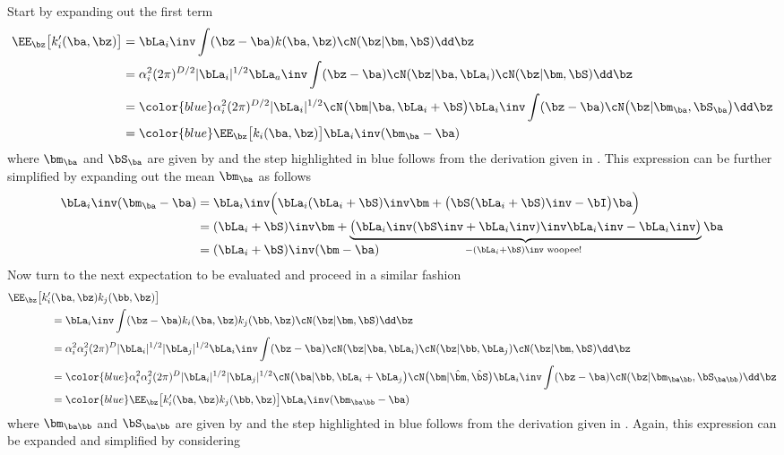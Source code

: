 Start by expanding out the first term
\begin{align}
\nonumber \EE_{\bz}\big[k'_i(\ba,\bz)\big]
&= \bLa_i\inv \int (\bz - \ba) k(\ba,\bz) \cN(\bz|\bm,\bS) \dd\bz \\
\nonumber &= \alpha_i^2(2\pi)^{D/2} |\bLa_i|^{1/2} \bLa_a\inv  \int (\bz - \ba)  \cN(\bz|\ba,\bLa_i) \cN(\bz|\bm,\bS)  \dd\bz   \\
\nonumber &= {\color{blue} \alpha_i^2 (2\pi)^{D/2} |\bLa_i|^{1/2}  \cN\big(\bm|\ba,\bLa_i+\bS\big) }
\bLa_i\inv \int (\bz - \ba) \cN\big(\bz|\bm_{\ba},\bS_{\ba}\big)  \dd\bz   \\
&=  {\color{blue} \EE_{\bz}\big[k_i(\ba,\bz)\big] } \bLa_i\inv (\bm_{\ba} - \ba)
\label{eqn:d1exp}
\end{align}
where $\bm_{\ba}$ and $\bS_{\ba}$ are given by  and the step highlighted in blue follows from the derivation given in . This expression can be further simplified by expanding out the mean $\bm_{\ba}$ as follows
\begin{align*}
\bLa_i\inv(\bm_{\ba} - \ba) 
&= \bLa_i\inv \Big( \bLa_i(\bLa_i+\bS)\inv\bm + \big(\bS(\bLa_i+\bS)\inv - \bI\big)\ba \Big) \\
&= (\bLa_i+\bS)\inv\bm
+ \underbrace{ \big(\bLa_i\inv(\bS\inv+\bLa_i\inv)\inv\bLa_i\inv - \bLa_i\inv\big) }
_{-(\bLa_i+\bS)\inv \text{  woopee! }} \ba  \\[-0.5cm]
&= (\bLa_i+\bS)\inv(\bm - \ba)
\end{align*}
Now turn to the next expectation to be evaluated and proceed in a similar fashion
\begin{align}
\nonumber \EE_{\bz}\big[k'_i&(\ba,\bz)k_j(\bb,\bz)\big] \\
\nonumber &= \bLa_i\inv \int (\bz - \ba) k_i(\ba,\bz)k_j(\bb,\bz) \cN(\bz|\bm, \bS) \dd\bz \\
\nonumber &= \alpha_i^2\alpha_j^2 (2\pi)^{D} |\bLa_i|^{1/2} |\bLa_j|^{1/2}
\bLa_i\inv \int (\bz - \ba) \cN(\bz|\ba,\bLa_i)\cN(\bz|\bb,\bLa_j) \cN(\bz|\bm, \bS) \dd\bz   \\
\nonumber &= {\color{blue} \alpha_i^2\alpha_j^2 (2\pi)^{D} |\bLa_i|^{1/2} |\bLa_j|^{1/2}
\cN\big(\ba|\bb,\bLa_i+\bLa_j\big) \cN\big(\bm|\hat\bm,\hat\bS \big) }
\bLa_i\inv \int (\bz - \ba) \cN(\bz|\bm_{\ba\bb},\bS_{\ba\bb}) \dd\bz \\
&= {\color{blue} \EE_{\bz}\big[k'_i(\ba,\bz)k_j(\bb,\bz)\big] }
\bLa_i\inv (\bm_{\ba\bb} - \ba)
\label{eqn:d2exp}
\end{align}
where $\bm_{\ba\bb}$ and $\bS_{\ba\bb}$ are given by  and the step highlighted in blue follows from the derivation given in . Again, this expression can be expanded and simplified by considering
